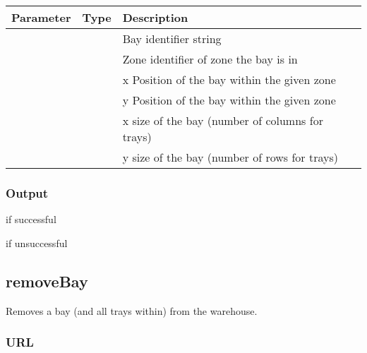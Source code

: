 \documentclass[letterpaper,10pt,english]{sphinxmanual}
\let\oldsubsection\subsection
\renewcommand{\subsection}{\needspace{6\baselineskip}\oldsubsection}
\begin{document}
\begin{savenotes}\sphinxattablestart
\centering
\begin{tabulary}{\linewidth}[t]{|T|T|T|}
\hline
\sphinxstyletheadfamily 
Parameter
&\sphinxstyletheadfamily 
Type
&\sphinxstyletheadfamily 
Description
\\
\hline
{}
&
&
Bay identifier string
\\
\hline
{}
&
&
Zone identifier of zone the bay is in
\\
\hline
{}
&
&
x Position of the bay within the given zone
\\
\hline
{}
&
&
y Position of the bay within the given zone
\\
\hline
{}
&
&
x size of the bay (number of columns for trays)
\\
\hline
{}
&
&
y size of the bay (number of rows for trays)
\\
\hline
\end{tabulary}
\par
\sphinxattableend\end{savenotes}


\subsubsection{Output}
\label{\detokenize{docs/Developer/addBay:output}}
 if successful

 if unsuccessful


\subsection{removeBay}
\label{\detokenize{docs/Developer/removeBay:removebay}}\label{\detokenize{docs/Developer/removeBay::doc}}
Removes a bay (and all trays within) from the warehouse.


\subsubsection{URL}
\label{\detokenize{docs/Developer/removeBay:url}}
\end{document}
